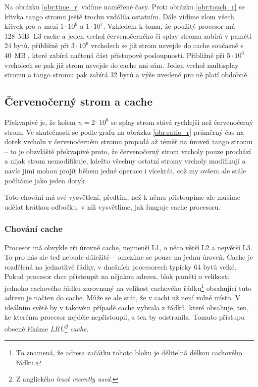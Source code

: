 
Na obrázku \ref{obr:time_r} vidíme naměřené časy. Proti obrázku \ref{obr:touch_r}
se křivka tango stromu ještě trochu vzdálila ostatním. Dále vidíme zlom všech
křivek pro $n$ mezi $1\cdot10^6$ a $1\cdot 10^7$. Vzhledem k tomu, že použitý
procesor má $128\,\operatorname{MB}$ L3 cache a jeden vrchol  červenočerného či
splay stromu zabírá v paměti 24 bytů, přibližně při $3\cdot 10^6$ vrcholech se již
strom nevejde do cache současně s $40\,\operatorname{MB}$, které zabírá načtená
část přístupové posloupnosti. Přibližně při $5\cdot10^6$ vrcholech se pak již strom nevejde do cache ani sám.
Jeden vrchol multisplay stromu a tango stromu pak zabírá 32 bytů a výše uvedené pro ně platí obdobně. 


\subsection{Červenočerný strom a cache}

Překvapivé je, že kolem $n=2\cdot10^6$ se splay strom stává rychlejší než
červenočerný strom. Ve skutečnosti se podle grafu na obrázku \ref{obr:ratio_r}
průměrný čas na dotek vrcholu v červenočerném stromu propadá až téměř na úroveň tango
stromu -- to je obzvláště překvapivé proto, že červenočerný strom vrcholy pouze
prochází a nijak strom nemodifikuje, kdežto všechny ostatní stromy vrcholy
modifikují a navíc jimi mohou projít během jedné operace i vícekrát, což my
ovšem ale stále počítáme jako jeden dotyk.

Toto chování má své vysvětlení, předtím, než k němu přistoupíme ale musíme
udělat krátkou odbočku, v níž vysvětlíme, jak funguje cache procesoru.

\subsubsection{Chování cache}

Procesor má obvykle tři úrovně cache, nejmenší L1, o něco větší L2 a největší
L3. To pro nás ale teď nebude důležité -- omezíme se pouze na jednu úroveň.
Cache je rozdělená na jednotlivé řádky, v dnešních procesorech typicky 64 bytů
velké. Pokud procesor chce přistoupit na nějakou adresu, blok paměti o
velikosti jednoho cachového řádku zarovnaný na velikost cachového
řádku\footnote{To znamená, že adresa začátku tohoto bloku je dělitelná délkou
cachového řádku.} obsahující tuto adresu je načten do cache. Může se ale stát,
že v cachi už není volné místo. V ideálním světě by v takovém případě cache
vybrala z řádků, které obsahuje, ten, ke kterému procesor nejdéle nepřistoupil,
a ten by odstranila. Tomuto přístupu obecně říkáme \emph{LRU\footnote{Z
anglického \emph{least recently used}.} cache}.

